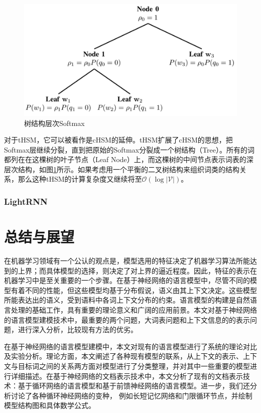 \documentclass[12pt,a4paper]{article}
\begin{document}
\begin{figure}
  \centering
  \includegraphics[width=0.65\columnwidth]{./figures/thsm.jpg}
  \caption{树结构层次Softmax}
  \label{fig:thsm}
\end{figure}
对于tHSM，它可以被看作是cHSM的延伸。tHSM扩展了cHSM的思想，把Softmax层继续分裂，直到把原始的Softmax分裂成一个树结构（Tree）。所有的词都列在在这棵树的叶子节点（Leaf Node）上，而这棵树的中间节点表示词表的深层次结构，如图\ref{fig:thsm}所示。如果考虑用一个平衡的二叉树结构来组织词类的结构关系，那么这种tHSM的计算复杂度又继续将至${\mathcal{O}(\log |\mathcal{V}|)}$。

\subsubsection{LightRNN}



\section{总结与展望}
在机器学习领域有一个公认的观点是，模型选用的特征决定了机器学习算法所能达到的上界；而具体模型的选择，则决定了对上界的逼近程度。因此，特征的表示在机器学习中是至关重要的一个步骤。在基于神经网络的语言模型中，尽管不同的模型有着不同的性能，但这些模型均基于分布假说，语义由其上下文决定。这些模型所能表达出的语义，受到语料中各词上下文分布的约束。语言模型的构建是自然语言处理的基础工作，具有重要的理论意义和广阔的应用前景。本文对基于神经网络的语言模型建模技术中，最重要的两个问题，大词表问题和上下文信息的的表示问题，进行深入分析，比较现有方法的优劣。

在基于神经网络的语言模型建模中，本文对现有的语言模型进行了系统的理论对比及实验分析。理论方面，本文阐述了各种现有模型的联系，从上下文的表示、上下文与目标词之间的关系两方面对模型进行了分类整理，并对其中一些重要的模型进行详细描述。在基于神经网络的文档表示技术中，本文分析了现有的文档表示技术：基于循环网络的语言模型和基于前馈神经网络的语言模型。进一步，我们还分析讨论了各种循环神经网络的变种， 例如长短记忆网络和门限循环节点，并绘制模型结构图和具体数学公式。
\end{document}
